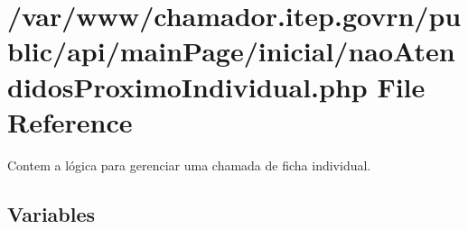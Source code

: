 \hypertarget{nao_atendidos_proximo_individual_8php}{}\section{/var/www/chamador.itep.\+govrn/public/api/main\+Page/inicial/nao\+Atendidos\+Proximo\+Individual.php File Reference}
\label{nao_atendidos_proximo_individual_8php}


Contem a lógica para gerenciar uma chamada de ficha individual.  


\subsection*{Variables}
